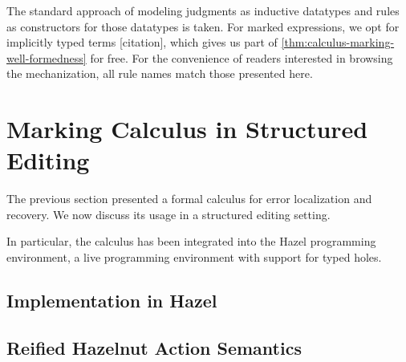The standard approach of modeling judgments as inductive datatypes and rules as constructors for
those datatypes is taken. For marked expressions, we opt for implicitly typed terms [citation],
which gives us part of \cref{thm:calculus-marking-well-formedness} for free. For the convenience of
readers interested in browsing the mechanization, all rule names match those presented here.

\section{Marking Calculus in Structured Editing}
\label{sec:calculus-structured-editing}

The previous section presented a formal calculus for error localization and recovery. We now discuss
its usage in a structured editing setting. 

In particular, the calculus has been integrated into the Hazel programming environment, a live
programming environment with support for typed holes.

\subsection{Implementation in Hazel}

\subsection{Reified Hazelnut Action Semantics}
\label{sec:calculus-hazelnut}
